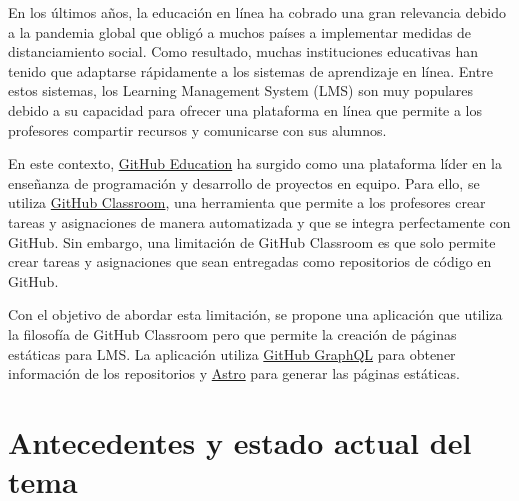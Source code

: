 En los últimos años, la educación en línea ha cobrado una gran relevancia debido a la pandemia global que obligó a muchos países a implementar medidas de distanciamiento social. Como resultado, muchas instituciones educativas han tenido que adaptarse rápidamente a los sistemas de aprendizaje en línea. Entre estos sistemas, los Learning Management System (LMS) son muy populares debido a su capacidad para ofrecer una plataforma en línea que permite a los profesores compartir recursos y comunicarse con sus alumnos.

En este contexto, \href{https://education.github.com/}{GitHub Education} ha surgido como una plataforma líder en la enseñanza de programación y desarrollo de proyectos en equipo. Para ello, se utiliza \href{https://classroom.github.com/}{GitHub Classroom}, una herramienta que permite a los profesores crear tareas y asignaciones de manera automatizada y que se integra perfectamente con GitHub. Sin embargo, una limitación de GitHub Classroom es que solo permite crear tareas y asignaciones que sean entregadas como repositorios de código en GitHub.

Con el objetivo de abordar esta limitación, se propone una aplicación que utiliza la filosofía de GitHub Classroom pero que permite la creación de páginas estáticas para LMS. La aplicación utiliza \href{https://docs.github.com/es/graphql}{GitHub GraphQL} para obtener información de los repositorios y \href{https://astro.build/}{Astro} para generar las páginas estáticas.

\section{Antecedentes y estado actual del tema}

